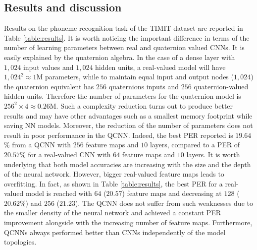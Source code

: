 \documentclass[a4paper]{article}
\begin{document}
\subsection{Results and discussion}
\label{sec:results}
Results on the phoneme recognition task of the TIMIT dataset are reported in Table \ref{table:results}. It is worth noticing the important difference in terms of the number of learning parameters between real and quaternion valued CNNs. It is easily explained by the quaternion algebra. In the case of a dense layer with $1,024$ input values and $1,024$ hidden units, a real-valued model will have $1,024^2\approx1$M parameters, while to maintain equal input and output nodes ($1,024$) the quaternion equivalent has $256$ quaternions inputs and $256$ quaternion-valued hidden units. Therefore the number of parameters for the quaternion model is $256^2\times4\approx0.26$M. Such a complexity reduction turns out to produce better results and may have other advantages such as a smallest memory footprint while saving NN models. Moreover, the reduction of the number of parameters does not result in poor performance in the QCNN. Indeed, the best PER reported is $19.64$\% from a QCNN with $256$ feature maps and $10$ layers, compared to a PER of $20.57$\% for a real-valued CNN with $64$ feature maps and $10$ layers. It is worth underlying that both model accuracies are increasing with the size and the depth of the neural network. However, bigger real-valued feature maps leads to overfitting. In fact, as shown in Table \ref{table:results}, the best PER for a real-valued model is reached with $64$ ($20.57$) feature maps and decreasing at $128$ ($20.62$\%) and $256$ ($21.23$). The QCNN does not suffer from such weaknesses due to the smaller density of the neural network and achieved a constant PER improvement alongside with the increasing number of feature maps. Furthermore, QCNNs always performed better than CNNs independently of the model topologies.   
\end{document}
